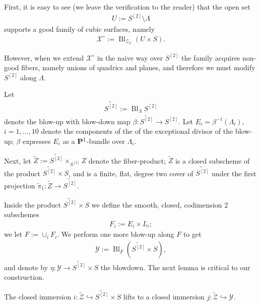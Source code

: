 \documentclass[12pt,reqno]{amsart}
\DeclareMathOperator{\Bl}{Bl}
\renewcommand{\to}{{\longrightarrow}}
\numberwithin{equation}{section}
\newcommand{\cX}{\mathcal{X}}
\begin{document}
First, it is easy to see (we leave the verification to the reader)
that the open set
\begin{align} 
  \label{eq:UB3}
  U := S^{[2]} \setminus \Lambda
\end{align}
supports a good family of cubic surfaces, namely
\begin{align}
  \label{eq:XUB3}
  \cX^{\circ} := \Bl_{\mathcal{Z}_{U}}(U \times S).
\end{align}


However, when we extend $\cX^{\circ}$ in the naive way over $S^{[2]}$
the family acquires non-good fibers, namely unions of quadrics and
planes, and therefore we must modify $S^{[2]}$ along $\Lambda$.

Let
\begin{align}
  \label{eq:S2tilde}
  \widetilde{S^{[2]}} := \Bl_{\Lambda}S^{[2]}
\end{align}
denote the blow-up with blow-down map
$\beta: \widetilde{S^{[2]}} \to S^{[2]}$.  Let
$E_{i} = \beta^{-1}(\Lambda_{i})$, $i=1, \dots, 10$ denote the
components of the of the exceptional divisor of the blow-up; $\beta$
expresses $E_{i}$ as a $\P^{1}$-bundle over $\Lambda_{i}$.

Next, let $\widetilde{Z} := \widetilde{S^{[2]}} \times_{S^{[2]}} Z$
denote the fiber-product; $\widetilde{Z}$ is a closed subscheme of the
product $\widetilde{S^{[2]}} \times S$, and is a finite, flat, degree
two cover of $\widetilde{S^{[2]}}$ under the first projection
$\tilde{\pi}_{1} : \widetilde{Z} \to \widetilde{S^{[2]}}.$

Inside the product $\widetilde{S^{[2]}} \times S$ we define the
smooth, closed, codimension $2$ subschemes
\begin{align}
  \label{eq:Fi}
  F_{i} := E_{i} \times L_{i};
\end{align}
we let $F := \cup_{i}F_{i}$.  We perform one more blow-up along $F$ to
get
\begin{align}
  \label{eq:Xtilde}
  \mathcal{Y} := \Bl_{F}\left( \widetilde{S^{[2]}} \times S \right),
\end{align}
and denote by $\eta: \mathcal{Y} \to \widetilde{S^{[2]}} \times S $
the blowdown.  The next lemma is critical to our construction.

\begin{lemma}
  The closed immersion
  $i: \widetilde{\mathcal{Z}} \hookrightarrow \widetilde{S^{[2]}}
  \times S$ lifts to a closed immersion
  $j: \widetilde{\mathcal{Z}} \hookrightarrow  \mathcal{Y}$.
\end{lemma}
\end{document}
